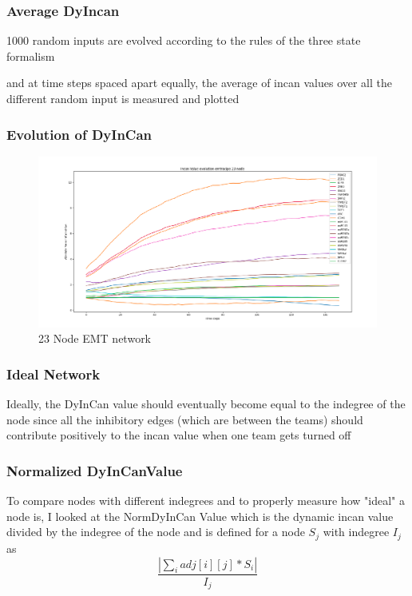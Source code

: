 \documentclass[t]{beamer}
\begin{document}
\begin{frame}
	\frametitle{Average DyIncan}
	1000 random inputs are evolved according to the rules of the three state formalism

	and at time steps spaced apart equally, the average of incan values over all the different random input is measured and plotted   
\end{frame}
\begin{frame}
	\frametitle{Evolution of DyInCan}

\begin{figure}[H]\centering

	\includegraphics[scale=0.17]{img/emtracipenonnomralised23.png}
	\caption{23 Node EMT network}
\end{figure}
\end{frame}

\begin{frame}
	\frametitle{Ideal Network}
	Ideally, the DyInCan value should eventually become equal to the indegree of the node since all the inhibitory edges (which are between the teams)  should contribute positively to the incan value when one team gets turned off
\end{frame}

\begin{frame}

	\frametitle{Normalized DyInCanValue}

	To compare nodes with different indegrees and to properly measure how "ideal" a node is, I looked at the NormDyInCan Value which is the dynamic incan value divided by the indegree of the node and is defined for a node $ S_j  $ with indegree $ I_j $ as 
	\[   \frac{ |\sum_{ i } ^ { } adj[i][j] * S_i|}{I_j}                    \]
	

\end{frame}
\end{document}
